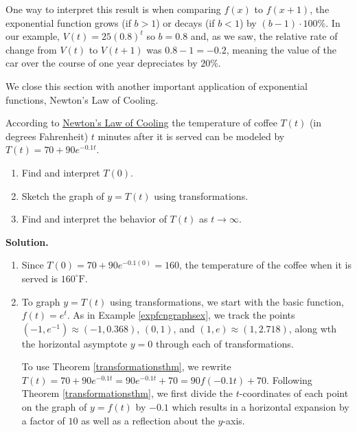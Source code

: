 One way to interpret this result is when comparing $f(x)$ to $f(x+1)$, the exponential function grows (if $b>1$) or decays (if $b<1$) by $(b-1) \cdot 100 \%$.  In our example, $V(t) = 25 (0.8)^{t}$ so $b = 0.8$ and, as we saw, the relative rate of change from $V(t)$ to $V(t+1)$ was $ 0.8 - 1= -0.2$, meaning the value of the car  over the course of one year depreciates by  $20 \%$.

\smallskip

We close this section with another important application of exponential functions,  Newton's Law of Cooling.

\smallskip

\begin{ex}  \label{exptempex} According to \href{http://en.wikipedia.org/wiki/Heat_transfer#Newton.27s_law_of_cooling}{\underline{Newton's Law of Cooling}} the temperature of coffee $T(t)$ (in degrees Fahrenheit) $t$ minutes after it is served can be modeled by $T(t) = 70 + 90 e^{-0.1 t}$. 

\begin{enumerate}

\item  Find and interpret $T(0)$.

\item  Sketch the graph of $y = T(t)$ using transformations.

\item  Find and interpret the behavior of $T(t)$ as $ t \rightarrow \infty$.

\end{enumerate}

{\bf Solution.}

\begin{enumerate}

\item  Since $T(0) =70 + 90 e^{-0.1 (0)} = 160$,   the temperature of the coffee when it is served is $160^{\circ}\mbox{F}$.

\item  To graph $y = T(t)$ using transformations, we start with the basic function, $f(t)=e^{t}$.  As in Example \ref{expfcngraphsex}, we track the points $(-1, e^{-1}) \approx (-1, 0.368)$, $(0,1)$, and $(1, e) \approx (1, 2.718)$, along wth the horizontal asymptote $y = 0$ through each of transformations.

\smallskip

To use Theorem  \ref{transformationsthm}, we rewrite   $T(t) = 70 + 90e^{-0.1t} = 90e^{-0.1t}+70 = 90 f(-0.1t)+70$.   Following Theorem  \ref{transformationsthm}, we first  divide the $t$-coordinates of each point on the graph of $y=f(t)$ by $-0.1$ which results in a horizontal expansion by a factor of $10$ as well as a reflection about the $y$-axis.  


\end{enumerate}
\end{ex}
